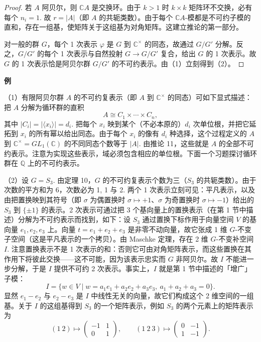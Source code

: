 \begin{proof}
若 \(A\) 阿贝尔，则 \(\mathbb{C}A\) 是交换环。由于 \(k > 1\) 时 \(k \times k\) 矩阵环不交换，必有每个 \(n_i = 1\). 故 \(r = |A|\)（即 \(A\) 的共轭类数）。由于每个 \(\mathbb{C}A\)-模都是不可约子模的直和，存在一组基，使矩阵关于这组基为对角矩阵。这建立推论的第一部分。

对一般的群 \(G\)，每个 1 次表示 \(\varphi\) 是 \(G\) 到 \(\mathbb{C}^\times\) 的同态，故通过 \(G/G'\) 分解。反之，\(G/G'\) 的每个 1 次表示与自然投射 \(G \to G/G'\) 复合，给出 \(G\) 的 1 次表示。故 \(G\) 的 1 次表示恰是阿贝尔群 \(G/G'\) 的不可约表示。由（1）立刻得到（2）。
\end{proof}

\noindent\textbf{例}

（1）有限阿贝尔群 \(A\) 的不可约复表示（即 \(A\) 到 \(\mathbb{C}^\times\) 的同态）可如下显式描述：把 \(A\) 分解为循环群的直积
\[
A \cong C_1 \times \cdots \times C_n,
\]
其中 \(|C_i| = |\langle x_i\rangle| = d_i\). 把每个 \(x_i\) 映到某个（不必本原的）\(d_i\) 次单位根，并把它延拓到 \(x_i\) 的所有幂以给出同态。由于每个 \(x_i\) 的像有 \(d_i\) 种选择，这个过程定义的 \(A\) 到 \(\mathbb{C}^\times = GL_1(\mathbb{C})\) 的不同同态个数等于 \(|A|\). 由推论 11，这些就是 \(A\) 的全部不可约表示。注意为实现这些表示，域必须包含相应的单位根。下面一个习题探讨循环群在 \(\mathbb{Q}\) 上的不可约表示。

（2）设 \(G = S_3\). 由定理 10，\(G\) 的不可约复表示个数为三（\(S_3\) 的共轭类数）。由于次数的平方和为 6，次数必为 1, 1 与 2. 两个 1 次表示立刻可见：平凡表示，以及由把置换映到其符号（即 \(\sigma\) 为偶置换时 \(\sigma \mapsto +1\)、\(\sigma\) 为奇置换时 \(\sigma \mapsto -1\)）给出的 \(S_3\) 到 \(\{\pm1\}\) 的表示。2 次表示可通过把 3 个基向量上的置换表示（在第 1 节中描述）分解为不可约表示而找到，如下：设 \(S_3\) 通过置换下标作用于向量空间 \(V\) 的基向量 \(e_1, e_2, e_3\) 上。向量 \(t = e_1+e_2+e_3\) 是非零不动向量，故它张成 1 维 \(G\)-不变子空间（这是平凡表示的一个拷贝）。由 Maschke 定理，存在 2 维 \(G\)-不变补空间 \(I\). 注意置换表示不是 1 次表示的和：否则它可由对角矩阵表示，而这些置换在其作用下将彼此交换——这不可能，因为该表示忠实而 \(G\) 非阿贝尔。故 \(I\) 不能进一步分解，于是 \(I\) 提供不可约 2 次表示。事实上，\(I\) 就是第 1 节中描述的「增广」子模：
\[
I = \{w \in V \mid w = a_1e_1+a_2e_2+a_3e_3,\ a_1+a_2+a_3 = 0\}.
\]
显然 \(e_1-e_2\) 与 \(e_2-e_3\) 是 \(I\) 中线性无关的向量，故它们构成这个 2 维空间的一组基。关于 \(I\) 的这组基得到 \(S_3\) 的一个矩阵表示，例如 \(S_3\) 的两个元素上的矩阵表示为
\[
(1\ 2) \mapsto \begin{pmatrix}-1 & 1\\ 0 & 1\end{pmatrix}, \qquad (1\ 2\ 3) \mapsto \begin{pmatrix}0 & -1\\ 1 & -1\end{pmatrix}.
\]

